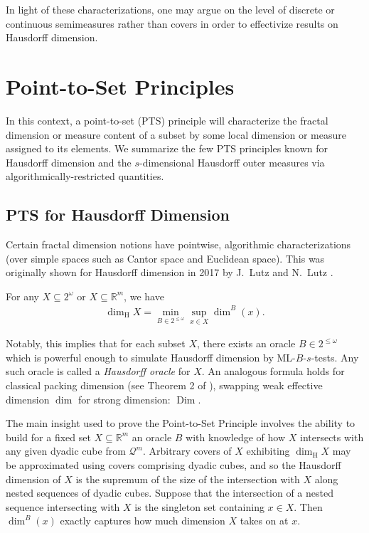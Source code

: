 In light of these characterizations, one may argue on the level of discrete or continuous semimeasures rather than covers in order to effectivize results on Hausdorff dimension. 

\section{Point-to-Set Principles} \label{section:PTS}

In this context, a point-to-set (PTS) principle will characterize the fractal dimension or measure content of a subset by some local dimension or measure assigned to its elements. We summarize the few PTS principles known for Hausdorff dimension and the $s$-dimensional Hausdorff outer measures via algorithmically-restricted quantities. 

\subsection{PTS for Hausdorff Dimension}

Certain fractal dimension notions have pointwise, algorithmic characterizations (over simple spaces such as Cantor space and Euclidean space). This was originally shown for Hausdorff dimension in 2017 by J.~Lutz and N.~Lutz \cite{LL18}. 

\begin{theorem}
    \label{theorem:PTS_for_H_dimension}
    For any $X \subseteq 2^\omega$ or $X \subseteq \mathbb{R}^m$, we have
    \begin{align*}
        \dim_{\operatorname{H}} X = \min_{B \in 2^{\leq \omega}} \sup_{x \in X} \dim^B(x).
    \end{align*}
\end{theorem}
Notably, this implies that for each subset $X$, there exists an oracle $B \in 2^{\leq \omega}$ which is powerful enough to simulate Hausdorff dimension by ML-$B$-$s$-tests. Any such oracle is called a \textit{Hausdorff oracle} for $X$. An analogous formula holds for classical packing dimension (see Theorem 2 of \cite{LL18}), swapping weak effective dimension $\dim$ for strong dimension: $\operatorname{Dim}$. 

The main insight used to prove the Point-to-Set Principle involves the ability to build for a fixed set $X \subseteq \mathbb{R}^m$ an oracle $B$ with knowledge of how $X$ intersects with any given dyadic cube from $\mathcal{Q}^m$. Arbitrary covers of $X$ exhibiting $\dim_{\operatorname{H}} X$ may be approximated using covers comprising dyadic cubes, and so the Hausdorff dimension of $X$ is the supremum of the size of the intersection with $X$ along nested sequences of dyadic cubes. Suppose that the intersection of a nested sequence intersecting with $X$ is the singleton set containing $x \in X$. Then $\dim^B(x)$ exactly captures how much dimension $X$ takes on at $x$.

